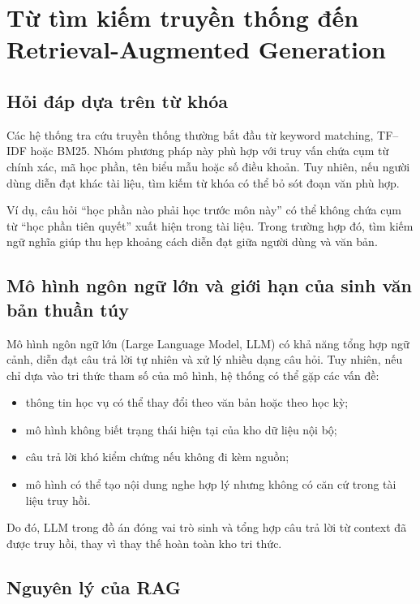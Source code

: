 \documentclass[../DoAn.tex]{subfiles}
\begin{document}
\section{Từ tìm kiếm truyền thống đến Retrieval-Augmented Generation}

\subsection{Hỏi đáp dựa trên từ khóa}

Các hệ thống tra cứu truyền thống thường bắt đầu từ keyword matching, TF--IDF
hoặc BM25. Nhóm phương pháp này phù hợp với truy vấn chứa cụm từ chính xác, mã
học phần, tên biểu mẫu hoặc số điều khoản. Tuy nhiên, nếu người dùng diễn đạt
khác tài liệu, tìm kiếm từ khóa có thể bỏ sót đoạn văn phù hợp.

Ví dụ, câu hỏi ``học phần nào phải học trước môn này'' có thể không chứa cụm từ
``học phần tiên quyết'' xuất hiện trong tài liệu. Trong trường hợp đó, tìm kiếm
ngữ nghĩa giúp thu hẹp khoảng cách diễn đạt giữa người dùng và văn bản.

\subsection{Mô hình ngôn ngữ lớn và giới hạn của sinh văn bản thuần túy}

Mô hình ngôn ngữ lớn (Large Language Model, LLM) có khả năng tổng hợp ngữ cảnh,
diễn đạt câu trả lời tự nhiên và xử lý nhiều dạng câu hỏi. Tuy nhiên, nếu chỉ dựa
vào tri thức tham số của mô hình, hệ thống có thể gặp các vấn đề:

\begin{itemize}
    \item thông tin học vụ có thể thay đổi theo văn bản hoặc theo học kỳ;
    \item mô hình không biết trạng thái hiện tại của kho dữ liệu nội bộ;
    \item câu trả lời khó kiểm chứng nếu không đi kèm nguồn;
    \item mô hình có thể tạo nội dung nghe hợp lý nhưng không có căn cứ trong tài
    liệu truy hồi.
\end{itemize}

Do đó, LLM trong đồ án đóng vai trò sinh và tổng hợp câu trả lời từ context đã
được truy hồi, thay vì thay thế hoàn toàn kho tri thức.

\subsection{Nguyên lý của RAG}
\end{document}

